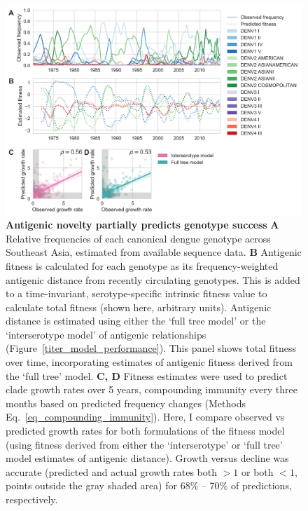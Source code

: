 \begin{figure}[h!]
  \begin{centering}
\includegraphics[width=\linewidth]{./png/genotype-fitness.png}
    \caption[Antigenic novelty partially predicts genotype success]{\textbf{Antigenic novelty partially predicts genotype success }
    \textbf{A} Relative frequencies of each canonical dengue genotype across Southeast Asia, estimated from available sequence data.
    \textbf{B} Antigenic fitness is calculated for each genotype as its frequency-weighted antigenic distance from recently circulating genotypes.
    This is added to a time-invariant, serotype-specific intrinsic fitness value to calculate total fitness (shown here, arbitrary units).
    Antigenic distance is estimated using either the `full tree model' or the `interserotype model' of antigenic relationships (Figure~\ref{titer_model_performance}).
    This panel shows total fitness over time, incorporating estimates of antigenic fitness derived from the `full tree' model.
    \textbf{C, D}  Fitness estimates were used to predict clade growth rates over 5 years, compounding immunity every three months based on predicted frequency changes (Methods Eq.~\ref{eq_compounding_immunity}).
    Here, I compare observed vs predicted growth rates for both formulations of the fitness model (using fitness derived from either the `interserotype' or `full tree' model estimates of antigenic distance).
    Growth versus decline was accurate (predicted and actual growth rates both $> 1$ or both $< 1$, points outside the gray shaded area) for 68\% -- 70\% of predictions, respectively.
}
     \label{genotype_fitness}
   \end{centering}
\end{figure}

